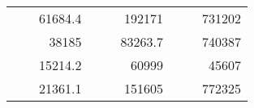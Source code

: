 \begin{table}[H]
\begin{tabular}{|ccrccrccc}
\rowcolor[HTML]{DDFDFF} 
\multicolumn{1}{|c|}{\cellcolor[HTML]{FFFFC7}}                                & \multicolumn{1}{c|}{\cellcolor[HTML]{DDFDFF}}                      & \multicolumn{1}{r|}{\cellcolor[HTML]{DAE8FC}61684.4}   & \multicolumn{1}{c|}{\cellcolor[HTML]{FFFFC7}}                                & \multicolumn{1}{c|}{\cellcolor[HTML]{DDFDFF}}                       & \multicolumn{1}{r|}{\cellcolor[HTML]{DDFDFF}192171}    & \multicolumn{1}{c|}{\cellcolor[HTML]{FFFFC7}}                                & \multicolumn{1}{c|}{\cellcolor[HTML]{DDFDFF}}                      & \multicolumn{1}{r|}{\cellcolor[HTML]{DDFDFF}731202}    \\ \cline{3-3} \cline{6-6} \cline{9-9} 
\multicolumn{1}{|c|}{\cellcolor[HTML]{FFFFC7}}                                & \multicolumn{1}{c|}{\cellcolor[HTML]{DDFDFF}}                      & \multicolumn{1}{r|}{\cellcolor[HTML]{DDFDFF}38185}     & \multicolumn{1}{c|}{\cellcolor[HTML]{FFFFC7}}                                & \multicolumn{1}{c|}{\cellcolor[HTML]{DDFDFF}}                       & \multicolumn{1}{r|}{\cellcolor[HTML]{DAE8FC}83263.7}   & \multicolumn{1}{c|}{\cellcolor[HTML]{FFFFC7}}                                & \multicolumn{1}{c|}{\cellcolor[HTML]{DDFDFF}}                      & \multicolumn{1}{r|}{\cellcolor[HTML]{DAE8FC}740387}    \\ \cline{3-3} \cline{6-6} \cline{9-9} 
\rowcolor[HTML]{DDFDFF} 
\multicolumn{1}{|c|}{\cellcolor[HTML]{FFFFC7}}                                & \multicolumn{1}{c|}{\cellcolor[HTML]{DDFDFF}}                      & \multicolumn{1}{r|}{\cellcolor[HTML]{DAE8FC}15214.2}   & \multicolumn{1}{c|}{\cellcolor[HTML]{FFFFC7}}                                & \multicolumn{1}{c|}{\cellcolor[HTML]{DDFDFF}}                       & \multicolumn{1}{r|}{\cellcolor[HTML]{DDFDFF}60999}     & \multicolumn{1}{c|}{\cellcolor[HTML]{FFFFC7}}                                & \multicolumn{1}{c|}{\cellcolor[HTML]{DDFDFF}}                      & \multicolumn{1}{r|}{\cellcolor[HTML]{DDFDFF}45607}     \\ \cline{3-3} \cline{6-6} \cline{9-9} 
\multicolumn{1}{|c|}{\cellcolor[HTML]{FFFFC7}}                                & \multicolumn{1}{c|}{\cellcolor[HTML]{DDFDFF}}                      & \multicolumn{1}{r|}{\cellcolor[HTML]{DDFDFF}21361.1}   & \multicolumn{1}{c|}{\cellcolor[HTML]{FFFFC7}}                                & \multicolumn{1}{c|}{\cellcolor[HTML]{DDFDFF}}                       & \multicolumn{1}{r|}{\cellcolor[HTML]{DAE8FC}151605}    & \multicolumn{1}{c|}{\cellcolor[HTML]{FFFFC7}}                                & \multicolumn{1}{c|}{\cellcolor[HTML]{DDFDFF}}                      & \multicolumn{1}{r|}{\cellcolor[HTML]{DAE8FC}772325}    \\ \cline{3-3} \cline{6-6} \cline{9-9} 

\end{tabular}
\end{table}
